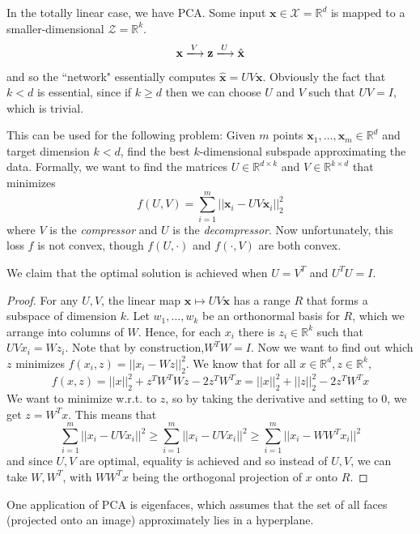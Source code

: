     In the totally linear case, we have PCA. Some input $\mathbf{x} \in \mathcal{X} = \mathbb{R}^d$ is mapped to a smaller-dimensional $\mathcal{Z} = \mathbb{R}^k$. 
    \[\mathbf{x} \xlongrightarrow[]{V} \mathbf{z} \xlongrightarrow{U} \hat{\mathbf{x}}\]
    and so the ``network" essentially computes $\hat{\mathbf{x}} = U V \mathbf{x}$. Obviously the fact that $k < d$ is essential, since if $k \geq d$ then we can choose $U$ and $V$ such that $UV = I$, which is trivial. 

    This can be used for the following problem: Given $m$ points $\mathbf{x}_1, \ldots, \mathbf{x}_m \in \mathbb{R}^d$ and target dimension $k < d$, find the best $k$-dimensional subspade approximating the data. Formally, we want to find the matrices $U \in \mathbb{R}^{d \times k}$ and $V \in \mathbb{R}^{k \times d}$ that minimizes 
    \[f(U, V) = \sum_{i=1}^m ||\mathbf{x}_i - U V \mathbf{x}_i||_2^2 \] 
    where $V$ is the \textit{compressor} and $U$ is the \textit{decompressor}. Now unfortunately, this loss $f$ is not convex, though $f(U, \cdot)$ and $f(\cdot, V)$ are both convex. 

    \begin{theorem}
    We claim that the optimal solution is achieved when $U = V^T$ and $U^T U = I$. 
    \end{theorem}
    \begin{proof}
        For any $U, V$, the linear map $\mathbf{x} \mapsto U V \mathbf{x}$ has a range $R$ that forms a subspace of dimension $k$. Let $w_1, \ldots,w_k$ be an orthonormal basis for $R$, which we arrange into columns of $W$. Hence, for each $x_i$ there is $z_i \in \mathbb{R}^k$ such that $UV x_i = W z_i$. Note that by construction,$W^T W = I$. Now we want to find out which $z$ minimizes $f(x_i, z) = ||x_i - W z||_2^2$. We know that for all $x \in \mathbb{R}^d, z \in \mathbb{R}^k$, 
    \[f(x, z) = ||x||_2^2 + z^T W^T W z - 2 z^T W^T x = ||x||_2^2 + ||z||_2^2 - 2 z^T W^T x\] 
    We want to minimize w.r.t. to $z$, so by taking the derivative and setting to $0$, we get $z = W^T x$. This means that 
    \[\sum_{i=1}^m ||x_i - U V x_i ||^2 \geq \sum_{i=1}^m ||x_i - UV x_i||^2 \geq \sum_{i=1}^m ||x_i - W W^T x_i||^2\] 
    and since $U, V$ are optimal, equality is achieved and so instead of $U, V$, we can take $W, W^T$, with $W W^T x$ being the orthogonal projection of $x$ onto $R$. 
    \end{proof}

    One application of PCA is eigenfaces, which assumes that the set of all faces (projected onto an image) approximately lies in a hyperplane. 

